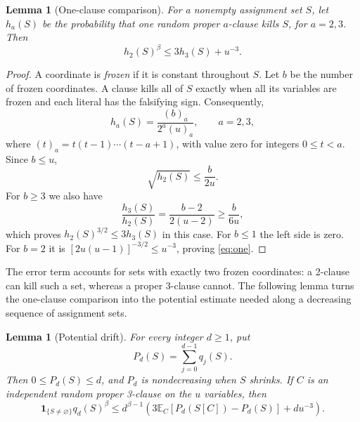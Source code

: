 \documentclass[11pt]{article}
\newtheorem{lemma}[theorem]{Lemma}
\theoremstyle{remark}
\newcommand{\E}{\mathbb E}
\newcommand{\ind}{\mathbf 1}
\numberwithin{equation}{section}
\begin{document}
\begin{lemma}[One-clause comparison]
\label{lem:one}
For a nonempty assignment set $S$, let $h_a(S)$ be the probability
that one random proper $a$-clause kills $S$, for $a=2,3$. Then
\begin{equation}
 h_2(S)^\beta\le3h_3(S)+u^{-3}.
 \label{eq:one}
\end{equation}
\end{lemma}

\begin{proof}
A coordinate is \emph{frozen} if it is constant throughout $S$.
Let $b$ be the number of frozen coordinates. A clause kills all of $S$
exactly when all its variables are frozen and each literal has the
falsifying sign. Consequently,
\[
 h_a(S)=\frac{(b)_a}{2^a(u)_a},\qquad a=2,3,
\]
where $(t)_a=t(t-1)\cdots(t-a+1)$, with value zero for integers
$0\le t<a$. Since $b\le u$,
\[
 \sqrt{h_2(S)}\le\frac b{2u}.
\]
For $b\ge3$ we also have
\[
 \frac{h_3(S)}{h_2(S)}=\frac{b-2}{2(u-2)}\ge\frac b{6u},
\]
which proves $h_2(S)^{3/2}\le3h_3(S)$ in this case.
For $b\le1$ the left side is zero. For $b=2$ it is
$[2u(u-1)]^{-3/2}\le u^{-3}$, proving \eqref{eq:one}.
\end{proof}

The error term accounts for sets with exactly two frozen coordinates:
a 2-clause can kill such a set, whereas a proper 3-clause cannot.
The following lemma turns the one-clause comparison into the potential
estimate needed along a decreasing sequence of assignment sets.

\begin{lemma}[Potential drift]
\label{lem:potential}
For every integer $d\ge1$, put
\[
 P_d(S)=\sum_{j=0}^{d-1}q_j(S).
\]
Then $0\le P_d(S)\le d$, and $P_d$ is nondecreasing when $S$ shrinks.
If $C$ is an independent random proper 3-clause on the $u$ variables,
then
\begin{equation}
 \ind_{\{S\ne\varnothing\}}q_d(S)^\beta
 \le d^{\beta-1}
 \left(3\E_C[P_d(S[C])-P_d(S)]+du^{-3}\right).
 \label{eq:drift}
\end{equation}
\end{lemma}
\end{document}
